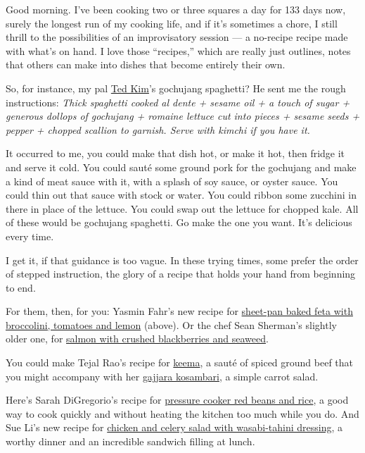 Good morning. I've been cooking two or three squares a day for 133 days
now, surely the longest run of my cooking life, and if it's sometimes a
chore, I still thrill to the possibilities of an improvisatory session
--- a no-recipe recipe made with what's on hand. I love those
``recipes,'' which are really just outlines, notes that others can make
into dishes that become entirely their own.

So, for instance, my pal
\href{https://www.nytco.com/person/theodore-kim/}{Ted Kim}'s gochujang
spaghetti? He sent me the rough instructions: \emph{Thick spaghetti
cooked al dente + sesame oil + a touch of sugar + generous dollops of
gochujang + romaine lettuce cut into pieces + sesame seeds + pepper +
chopped scallion to garnish. Serve with kimchi if you have it.}

It occurred to me, you could make that dish hot, or make it hot, then
fridge it and serve it cold. You could sauté some ground pork for the
gochujang and make a kind of meat sauce with it, with a splash of soy
sauce, or oyster sauce. You could thin out that sauce with stock or
water. You could ribbon some zucchini in there in place of the lettuce.
You could swap out the lettuce for chopped kale. All of these would be
gochujang spaghetti. Go make the one you want. It's delicious every
time.

I get it, if that guidance is too vague. In these trying times, some
prefer the order of stepped instruction, the glory of a recipe that
holds your hand from beginning to end.

For them, then, for you: Yasmin Fahr's new recipe for
\href{https://cooking.nytimes.com/recipes/1021277-sheet-pan-baked-feta-with-broccolini-tomatoes-and-lemon}{sheet-pan
baked feta with broccolini, tomatoes and lemon} (above). Or the chef
Sean Sherman's slightly older one, for
\href{https://cooking.nytimes.com/recipes/1020563-salmon-with-crushed-blackberries-and-seaweed}{salmon
with crushed blackberries and seaweed}.

You could make Tejal Rao's recipe for
\href{https://cooking.nytimes.com/recipes/1020913-keema-spiced-ground-meat}{keema},
a sauté of spiced ground beef that you might accompany with her
\href{https://cooking.nytimes.com/recipes/1020909-gajjara-kosambari-carrot-salad}{gajjara
kosambari}, a simple carrot salad.

Here's Sarah DiGregorio's recipe for
\href{https://cooking.nytimes.com/recipes/1020818-pressure-cooker-red-beans-and-rice}{pressure
cooker red beans and rice}, a good way to cook quickly and without
heating the kitchen too much while you do. And Sue Li's new recipe for
\href{https://cooking.nytimes.com/recipes/1021228-chicken-and-celery-salad-with-wasabi-tahini-dressing}{chicken
and celery salad with wasabi-tahini dressing}, a worthy dinner and an
incredible sandwich filling at lunch.


